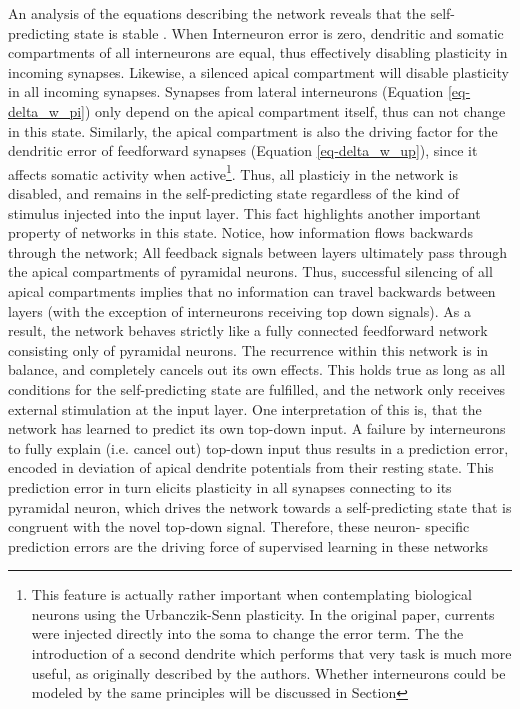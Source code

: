 An analysis of the equations describing the network reveals that the self-predicting state is stable \phrasing. When
Interneuron error is zero, dendritic and somatic compartments of all interneurons are equal, thus effectively disabling
plasticity in incoming synapses. Likewise, a silenced apical compartment will disable plasticity in all incoming
synapses. Synapses from lateral interneurons (Equation \ref{eq-delta_w_pi}) only depend on the apical compartment
itself, thus can not change in this state. Similarly, the apical compartment is also the driving factor for the
dendritic error of feedforward synapses (Equation \ref{eq-delta_w_up}), since it affects somatic activity when
active\footnote{This feature is actually rather important when contemplating biological neurons using the Urbanczik-Senn
  plasticity. In the original paper, currents were injected directly into the soma to change the error term. The the
  introduction of a second dendrite which performs that very task is much more useful, as originally described by the
  authors. Whether interneurons could be modeled by the same principles will be discussed in Section }. Thus, all plasticiy in the network is disabled, and remains in the self-predicting state
regardless of the kind of stimulus injected into the input layer. This fact highlights another important property of
networks in this state. Notice, how information flows backwards through the network; All feedback signals between layers
ultimately pass through the apical compartments of pyramidal neurons. Thus, successful silencing of all apical
compartments implies that no information can travel backwards between layers (with the exception of interneurons
receiving top down signals). As a result, the network behaves strictly like a fully connected feedforward network
consisting only of pyramidal neurons. The recurrence within this network is in balance, and completely cancels out its
own effects. This holds true as long as all conditions for the self-predicting state are fulfilled, and the network only
receives external stimulation at the input layer. One interpretation of this is, that the network has learned to predict
its own top-down input. A failure by interneurons to fully explain (i.e. cancel out) top-down input thus results in a
prediction error, encoded in deviation of apical dendrite potentials from their resting state. This prediction error in
turn elicits plasticity in all synapses connecting to its pyramidal neuron, which drives the network towards a
self-predicting state that is congruent with the novel top-down signal. Therefore, these neuron- specific prediction
errors are the driving force of supervised learning in these networks



